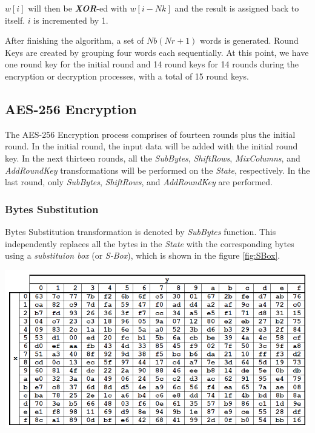 \documentclass[a4paper, 10pt]{article}
\newenvironment{Figure}
    {\par\medskip\noindent\minipage{\linewidth}}
    {\endminipage\par\medskip}
\begin{document}
\begin{multicols}{2}
                $w[i]$ will then be \textbf{\textit{XOR}}-ed with $w[i-Nk]$ and the result is assigned back to itself. $i$ is incremented by 1.

                After finishing the algorithm, a set of $Nb(Nr+1)$ words is generated. Round Keys are created by grouping four words each sequentially. At this point, we have one round key for the initial round and 14 round keys for 14 rounds during the encryption or decryption processes, with a total of 15 round keys.

            \subsection{AES-256 Encryption}

	The AES-256 Encryption process comprises of fourteen rounds plus the initial round. In the initial round, the input data will be added with the initial round key. In the next thirteen rounds, all the  \textit{SubBytes}, \textit{ShiftRows}, \textit{MixColumns}, and \textit{AddRoundKey} transformations will be performed on the \textit{State}, respectively. In the last round, only \textit{SubBytes}, \textit{ShiftRows}, and \textit{AddRoundKey} are performed.

            \subsubsection{Bytes Substitution}

            Bytes Substitution transformation is denoted by \textit{SubBytes} function. This independently replaces all the bytes in the \textit{State} with the corresponding bytes using a \textit{substituion box} (or \textit{S-Box}), which is shown in the figure \ref{fig:SBox}.

            \noindent
            \begin{Figure}
                \centering
                \includegraphics[width=\linewidth]{S-Box.png}
                \label{fig:SBox}
            \end{Figure}


\end{multicols}
\end{document}
